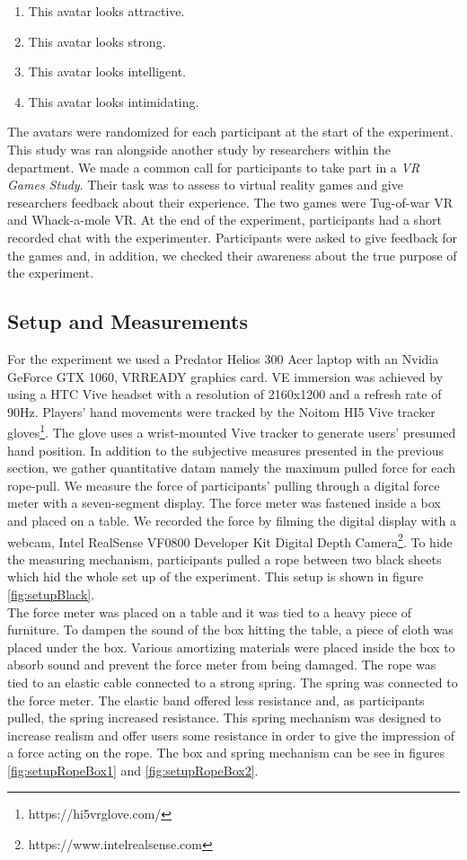 \begin{enumerate}
\itemsep0em 
\item This avatar looks attractive.
\item This avatar looks strong.
\item This avatar looks intelligent.
\item This avatar looks intimidating.
\end{enumerate}
The avatars were randomized for each participant at the start of the experiment. This study was ran alongside another study by researchers within the department. We made a common call for participants to take part in a \textit{VR Games Study}. Their task was to assess to virtual reality games and give researchers feedback about their experience. The two games were Tug-of-war VR and Whack-a-mole VR. At the end of the experiment, participants had a short recorded chat with the experimenter. Participants were asked to give feedback for the games and, in addition, we checked their awareness about the true purpose of the experiment.

\subsection{Setup and Measurements}
\label{subsection:SetupMeasurements}
For the experiment we used a Predator Helios 300 Acer laptop with an Nvidia GeForce GTX 1060, VRREADY graphics card. VE immersion was achieved by using a HTC Vive headset with a resolution of 2160x1200 and a refresh rate of 90Hz. 
Players' hand movements were tracked by the Noitom HI5 Vive tracker gloves\footnote{https://hi5vrglove.com/}. The glove uses a wrist-mounted Vive tracker to generate users' presumed hand position. 
In addition to the subjective measures presented in the previous section, we gather quantitative datam namely the maximum pulled force for each rope-pull. We measure the force of participants' pulling through a digital force meter with a seven-segment display. The force meter was fastened inside a box and placed on a table. We recorded the force by filming the digital display with a webcam, Intel RealSense VF0800 Developer Kit Digital Depth Camera\footnote{https://www.intelrealsense.com}.
To hide the measuring mechanism, participants pulled a rope between two black sheets which hid the whole set up of the experiment. This setup is shown in figure \ref{fig:setupBlack}.\\
The force meter was placed on a table and it was tied to a heavy piece of furniture. To dampen the sound of the box hitting the table, a piece of cloth was placed under the box. Various amortizing materials were placed inside the box to absorb sound and prevent the force meter from being damaged. The rope was tied to an elastic cable connected to a strong spring. The spring was connected to the force meter. The elastic band offered less resistance and, as participants pulled, the spring increased resistance. This spring mechanism was designed to increase realism and offer users some resistance in order to give the impression of a force acting on the rope. The box and spring mechanism can be see in figures \ref{fig:setupRopeBox1} and \ref{fig:setupRopeBox2}.\\



